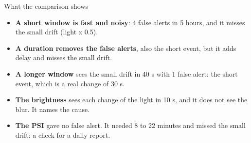 \begin{frame}{What the comparison shows}
  \small
  \begin{itemize}
    \item \textbf{A short window is fast and noisy}: 4 false alerts in 5
          hours, and it misses the small drift (light x 0.5).
    \item \textbf{A duration removes the false alerts}, also the short event,
          but it adds delay and misses the small drift.
    \item \textbf{A longer window} sees the small drift in 40 s with 1 false
          alert: the short event, which is a real change of 30 s.
    \item \textbf{The brightness} sees each change of the light in 10 s,
          and it does not see the blur. It names the cause.
    \item \textbf{The PSI} gave no false alert. It needed 8 to 22 minutes
          and missed the small drift: a check for a daily report.
  \end{itemize}
\end{frame}

